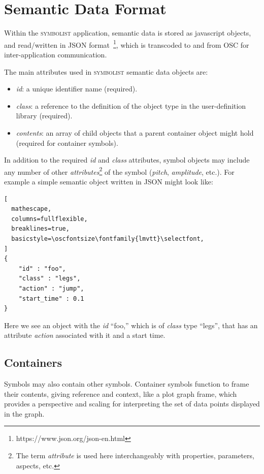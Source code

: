 \documentclass{article}
\def\symbolist{\textsc{symbolist}\xspace}
\def\oscfontsize{\footnotesize}
\begin{document}
\section{Semantic Data Format}\label{sec:format}

Within the \symbolist application, semantic data is stored as javascript objects, and read/written in JSON format~\footnote{https://www.json.org/json-en.html}, which is transcoded to and from OSC for inter-application communication.

The main attributes used in \symbolist semantic data objects are:

\begin{itemize}\itemsep0pt 
\item \textit{id}: a unique identifier name (required).
\item \textit{class}: a reference to the definition of the object type in the user-definition library (required).
\item \textit{contents}: an array of child objects that a parent container object might hold (required for container symbols).
\end{itemize}

In addition to the required \textit{id} and \textit{class} attributes, symbol objects may include any number of other \textit{attributes}\footnote{The term \textit{attribute} is used here interchangeably with properties, parameters, aspects, etc.} of the symbol (\textit{pitch}, \textit{amplitude}, etc.). For example a simple semantic object written in JSON might look like:

\begin{lstlisting}[
  mathescape,
  columns=fullflexible,
  breaklines=true,
  basicstyle=\oscfontsize\fontfamily{lmvtt}\selectfont,
]
{
    "id" : "foo",
    "class" : "legs",
    "action" : "jump",
    "start_time" : 0.1
}
\end{lstlisting}

\noindent
Here we see an object with the \textit{id} ``foo,'' which is of \textit{class} type ``legs'', that has an attribute \textit{action} associated with it and a start time.

\subsection{Containers}
Symbols may also contain other symbols. 
Container symbols function to frame their contents, giving reference and context, like a plot graph frame, which provides a perspective and scaling for interpreting the set of data points displayed in the graph.
\end{document}
